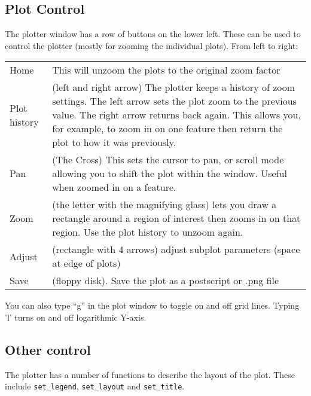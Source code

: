 \documentclass[11pt]{article}
\newcommand{\cmd}[1]{{\tt #1}}
\begin{document}
\subsection{Plot Control}

The plotter window has a row of buttons on the
lower left. These can be used to control the plotter (mostly for
zooming the individual plots). From left to right:

\begin{tabular}{ll}

Home & This will unzoom the plots to the original zoom factor \\

Plot history & \parbox[t]{0.8\textwidth}{(left and right arrow) The
plotter keeps a history of zoom settings. The left arrow sets the plot
zoom to the previous value. The right arrow returns back again. This
allows you, for example, to zoom in on one feature then return the
plot to how it was previously. }\\

Pan & \parbox[t]{0.8\textwidth}{(The Cross) This sets the cursor to
  pan, or scroll mode allowing you to shift the plot within the
  window. Useful when zoomed in on a feature. }\\

Zoom & \parbox[t]{0.8\textwidth}{(the letter with the magnifying
  glass) lets you draw a rectangle around a region of interest then
  zooms in on that region. Use the plot history to unzoom again.}\\

Adjust & \parbox[t]{0.8\textwidth}{(rectangle with 4 arrows) adjust
  subplot parameters (space at edge of plots)}\\

Save & \parbox[t]{0.8\textwidth}{(floppy disk). Save the plot as a
postscript or .png file}\\

\end{tabular}

You can also type ``g'' in the plot window to toggle on and off grid
lines. Typing 'l' turns on and off logarithmic Y-axis.

\subsection{Other control}

The plotter has a number of functions to describe the layout of the
plot. These include \cmd{set\_legend}, \cmd{set\_layout} and \cmd{set\_title}.
\end{document}
